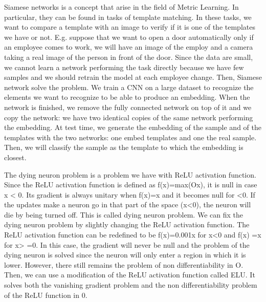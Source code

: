 \begin{box-stud}
    Siamese networks is a concept that arise in the field of Metric Learning. In particular, they can be found in tasks of template matching. In these tasks, we want to compare a template with an image to verify if it is one of the templates we have or not. E.g. suppose that we want to open a door automatically only if an employee comes to work, we will have an image of the employ and a camera taking a real image of the person in front of the door. Since the data are small, we cannot learn a network performing the task directly because we have few samples and we should retrain the model at each employee change. Then, Siamese network solve the problem. We train a CNN on a large dataset to recognize the elements we want to recognize to be able to produce an embedding. When the network is finished, we remove the fully connected network on top of it and we copy the network: we have two identical copies of the same network performing the embedding. At test time, we generate the embedding of the sample and of the templates with the two networks: one embed templates and one the real sample. Then, we will classify the sample as the template to which the embedding is closest.
\end{box-stud}


\begin{box-stud}
    The dying neuron problem is a problem we have with ReLU activation function. Since the ReLU activation function is defined as f(x)=max(Ox), it is null in case x < 0. Its gradient is always unitary when f(x)=x and it becomes null for <0. If the updates make a neuron go in that part of the space (x<0), the neuron will die by being turned off. This is called dying neuron problem. We can fix the dying neuron problem by slightly changing the ReLU activation function. The ReLU activation function can be redefined to be f(x)=0.001x for x<0 and f(x) =x for x> =0. In this case, the gradient will never be null and the problem of the dying neuron is solved since the neuron will only enter a region in which it is lower. However, there still remains the problem of non differentiability in O. Then, we can use a modification of the ReLU activation function called ELU. It solves both the vanishing gradient problem and the non differentiability problem of the ReLU function in 0.
\end{box-stud}

